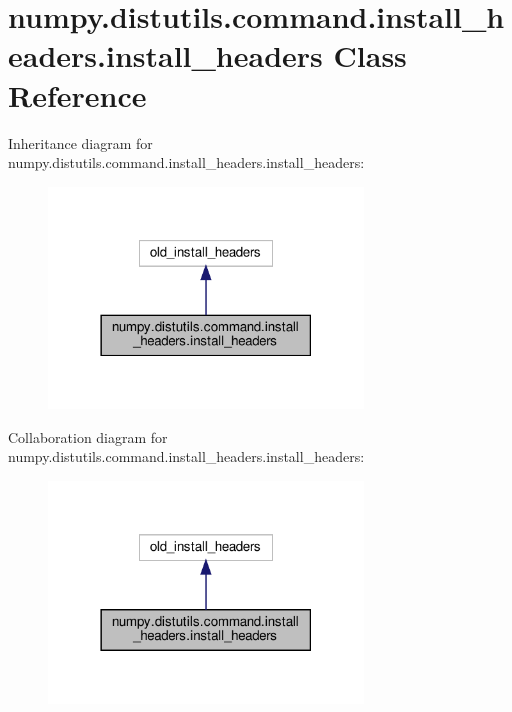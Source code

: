 \hypertarget{classnumpy_1_1distutils_1_1command_1_1install__headers_1_1install__headers}{}\section{numpy.\+distutils.\+command.\+install\+\_\+headers.\+install\+\_\+headers Class Reference}
\label{classnumpy_1_1distutils_1_1command_1_1install__headers_1_1install__headers}


Inheritance diagram for numpy.\+distutils.\+command.\+install\+\_\+headers.\+install\+\_\+headers\+:
\nopagebreak
\begin{figure}[H]
\begin{center}
\leavevmode
\includegraphics[width=237pt]{classnumpy_1_1distutils_1_1command_1_1install__headers_1_1install__headers__inherit__graph}
\end{center}
\end{figure}


Collaboration diagram for numpy.\+distutils.\+command.\+install\+\_\+headers.\+install\+\_\+headers\+:
\nopagebreak
\begin{figure}[H]
\begin{center}
\leavevmode
\includegraphics[width=237pt]{classnumpy_1_1distutils_1_1command_1_1install__headers_1_1install__headers__coll__graph}
\end{center}
\end{figure}
